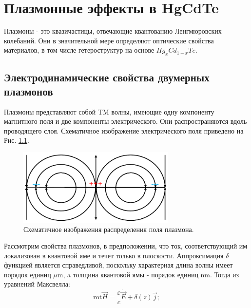 \documentclass[../main.tex]{subfiles}
\newcommand{\rot}{\text{rot}}
\begin{document}
    \chapter{Плазмонные эффекты в HgCdTe}
    
    Плазмоны - это квазичастицы, отвечающие квантованию 
    Ленгмюровских колебаний. Они в значительной мере 
    определяют оптические свойства материалов, в том числе 
    гетероструктур на основе $Hg_xCd_{1-x}Te$.

    \section{Электродинамические свойства двумерных плазмонов}

    Плазмоны представляют собой TM волны, имеющие одну компоненту 
    магнитного поля и две компоненты электрического. Они распространяются 
    вдоль проводящего слоя. Схематичное изображение электрического поля 
    приведено на Рис. \ref{plasmons:schematic:fields}.

    \begin{figure}[h]
        \begin{minipage}[h]{1\textwidth}
            \includegraphics[width=0.7\textwidth]{./images/schematic_field.pdf}
            \caption{Схематичное изображения распределения поля плазмона.
            \label{plasmons:schematic:fields}}
        \end{minipage}
    \end{figure}

    Рассмотрим свойства плазмонов, в предположении, что ток,
    соответствующий им локализован в квантовой яме и течет только
    в плоскости. Аппроксимация $\delta$ функцией является 
    справедливой, поскольку характерная длина волны имеет порядок 
    единиц $\mu\text{m}$, a толщина квантовой ямы - порядок единиц 
    $\text{nm}$. Тогда из уравнений Максвелла:
    \begin{equation}
        \rot \vec H = \frac{\varepsilon}{c} \dot{\vec E} + \delta(z) \vec j;
    \end{equation}
\end{document}
